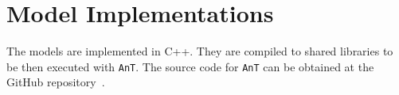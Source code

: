 \section{Model Implementations}
\label{app:impl.models}

The models are implemented in C++.
They are compiled to shared libraries to be then executed with \texttt{AnT}.
The source code for \texttt{AnT} can be obtained at the GitHub repository~\cite{AnTCode}.



